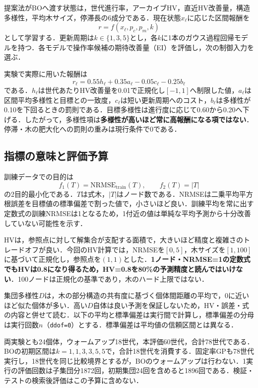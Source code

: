 \documentclass[a4paper,10pt,twocolumn]{ltjsarticle}
\newcommand{\NRMSE}{\mathrm{NRMSE}}
\begin{document}
提案法がBOへ渡す状態は，世代進行率，アーカイブHV，直近HV改善量，構造多様性，平均木サイズ，停滞長の6成分である．現在状態\(x_\ell\)に応じた区間報酬を
\begin{equation}
 r=f(x_\ell,p_c,p_m,k)
\end{equation}
として学習する．更新周期は\(k\in\{1,3,5\}\)とし，各\(k\)に1本のガウス過程回帰モデルを持つ．各モデルで操作率候補の期待改善量（EI）を評価し，次の制御入力を選ぶ．

実験で実際に用いた報酬は
\begin{equation}
 r_\ell=0.55h_\ell+0.35a_\ell-0.05c_\ell-0.25b_\ell
\end{equation}
である．\(h_\ell\)は世代あたりHV改善量を0.01で正規化し\([-1,1]\)へ制限した値，\(a_\ell\)は区間平均多様性と目標との一致度，\(c_\ell\)は短い更新周期へのコスト，\(b_\ell\)は多様性が0.10を下回るときの罰則である．目標多様性は進行度に応じて0.60から0.20へ下げる．したがって，多様性項は\textbf{多様性が高いほど常に高報酬になる項ではない}．停滞・木の肥大化への罰則の重みは現行条件で0である．

\subsection{指標の意味と評価予算}
訓練データでの目的は
\begin{equation}
 f_1(T)=\NRMSE_{\mathrm{train}}(T),\qquad f_2(T)=|T|
\end{equation}
の2目的最小化である．\(T\)は式木，\(|T|\)はノード数である．NRMSEは二乗平均平方根誤差を目標値の標準偏差で割った値で，小さいほど良い．訓練平均を常に出す定数式の訓練NRMSEは1となるため，1付近の値は単純な平均予測から十分改善していない可能性を示す．

HVは，参照点に対して解集合が支配する面積で，大きいほど精度と複雑さのトレードオフが良い．今回のHV計算では，NRMSEを\([0,5]\)，木サイズを\([1,100]\)に基づいて正規化し，参照点を\((1,1)\)とした．\textbf{1ノード・NRMSE=1の定数式でもHVは0.8になり得るため，HV=0.8を80\%の予測精度と読んではいけない}．100ノードは正規化の基準であり，木のハード上限ではない．

集団多様性\(D\)は，木の部分構造の共有度に基づく個体間距離の平均で，0に近いほど似た個体が多い．高い\(D\)自体は良い予測を保証しないため，HV・誤差・式の内容と併せて読む．以下の平均と標準偏差は実行間で計算し，標準偏差の分母は実行回数\(n\)（\texttt{ddof=0}）とする．標準偏差は平均値の信頼区間とは異なる．

両実験とも24個体，ウォームアップ18世代，本評価60世代，合計78世代である．BOの初期区間は\(k=1,1,3,3,5,5\)で，合計18世代を消費する．固定率GPも78世代実行し，18世代を同じ比較境界とするが，BOのウォームアップは行わない．1実行の評価回数は子集団分1872回，初期集団24回を含めると1896回である．検証・テストの検索後評価はこの予算に含めない．
\end{document}

